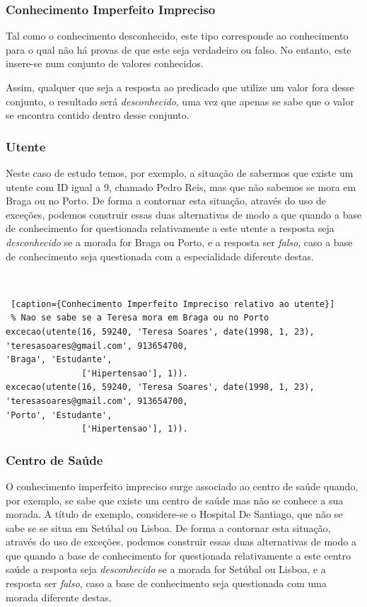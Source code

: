 \documentclass[a4paper, 11pt]{article}
\begin{document}
\pagebreak

\subsubsection{Conhecimento Imperfeito Impreciso}

Tal como o conhecimento desconhecido, este tipo corresponde ao
conhecimento para o qual não há provas de que este seja verdadeiro ou falso.
No entanto, este insere-se num conjunto de valores conhecidos.

Assim, qualquer que seja a resposta ao predicado que utilize um valor fora
desse conjunto, o resultado será \textit{desconhecido}, uma vez que apenas se sabe que o
valor se encontra contido dentro desse conjunto.

\subsubsection*{Utente}

Neste caso de estudo temos, por exemplo, a situação de sabermos que existe
um utente com ID igual a 9, chamado Pedro Reis, mas que não sabemos se mora em Braga ou no Porto. 
De forma a contornar esta situação, através do uso de
exceções, podemos construir essas duas alternativas de modo a que quando a base de
conhecimento for questionada relativamente a este utente a resposta seja \textit{desconhecido} se a
morada for Braga ou Porto, e a resposta ser \textit{falso}, caso a
base de conhecimento seja questionada com a especialidade diferente destas.

\

\begin{lstlisting} [caption={Conhecimento Imperfeito Impreciso relativo ao utente}]
 % Nao se sabe se a Teresa mora em Braga ou no Porto
excecao(utente(16, 59240, 'Teresa Soares', date(1998, 1, 23), 'teresasoares@gmail.com', 913654700, 
'Braga', 'Estudante',
               ['Hipertensao'], 1)).
excecao(utente(16, 59240, 'Teresa Soares', date(1998, 1, 23), 'teresasoares@gmail.com', 913654700, 
'Porto', 'Estudante',
               ['Hipertensao'], 1)).
\end{lstlisting}

\subsubsection*{Centro de Saúde}

O conhecimento imperfeito impreciso surge associado ao centro de saúde quando, por exemplo, se 
sabe que existe um centro de saúde mas não se conhece a sua morada. A título de exemplo, 
considere-se o Hospital De Santiago, que não se sabe se se situa em Setúbal ou Lisboa. De forma a 
contornar esta situação, através do uso de exceções, podemos construir essas duas alternativas 
de modo a que quando a base de
conhecimento for questionada relativamente a este centro saúde a resposta seja 
\textit{desconhecido} se a
morada for Setúbal ou Lisboa, e a resposta ser \textit{falso}, caso a
base de conhecimento seja questionada com uma morada diferente destas.
\end{document}
